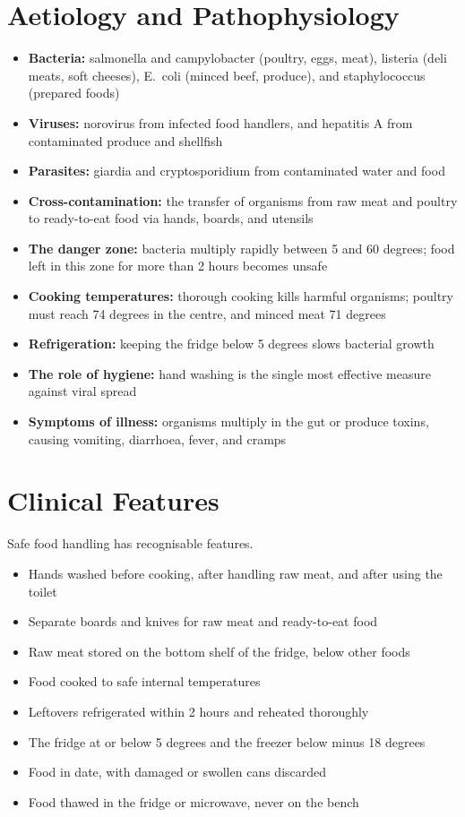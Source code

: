 \section*{Aetiology and Pathophysiology}
\begin{itemize}
    \item \textbf{Bacteria:} salmonella and campylobacter (poultry, eggs, meat), listeria (deli meats, soft cheeses), E.\ coli (minced beef, produce), and staphylococcus (prepared foods)
    \item \textbf{Viruses:} norovirus from infected food handlers, and hepatitis A from contaminated produce and shellfish
    \item \textbf{Parasites:} giardia and cryptosporidium from contaminated water and food
    \item \textbf{Cross-contamination:} the transfer of organisms from raw meat and poultry to ready-to-eat food via hands, boards, and utensils
    \item \textbf{The danger zone:} bacteria multiply rapidly between 5 and 60 degrees; food left in this zone for more than 2 hours becomes unsafe
    \item \textbf{Cooking temperatures:} thorough cooking kills harmful organisms; poultry must reach 74 degrees in the centre, and minced meat 71 degrees
    \item \textbf{Refrigeration:} keeping the fridge below 5 degrees slows bacterial growth
    \item \textbf{The role of hygiene:} hand washing is the single most effective measure against viral spread
    \item \textbf{Symptoms of illness:} organisms multiply in the gut or produce toxins, causing vomiting, diarrhoea, fever, and cramps
\end{itemize}

\section*{Clinical Features}
Safe food handling has recognisable features.
\begin{itemize}
    \item Hands washed before cooking, after handling raw meat, and after using the toilet
    \item Separate boards and knives for raw meat and ready-to-eat food
    \item Raw meat stored on the bottom shelf of the fridge, below other foods
    \item Food cooked to safe internal temperatures
    \item Leftovers refrigerated within 2 hours and reheated thoroughly
    \item The fridge at or below 5 degrees and the freezer below minus 18 degrees
    \item Food in date, with damaged or swollen cans discarded
    \item Food thawed in the fridge or microwave, never on the bench
\end{itemize}

